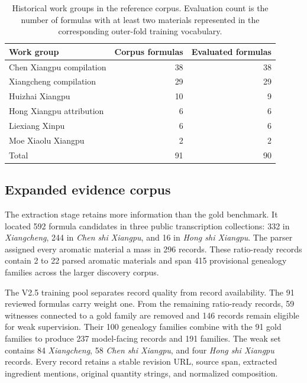 \documentclass[11pt,a4paper]{article}
\begin{document}
\begin{table}[t]
\centering
\caption{Historical work groups in the reference corpus. Evaluation count is the number of formulas with at least two materials represented in the corresponding outer-fold training vocabulary.}
\label{tab:corpus}
\begin{threeparttable}
\begin{tabular}{lrr}
\toprule
Work group & Corpus formulas & Evaluated formulas \\
\midrule
Chen Xiangpu compilation & 38 & 38 \\
Xiangcheng compilation & 29 & 29 \\
Huizhai Xiangpu & 10 & 9 \\
Hong Xiangpu attribution & 6 & 6 \\
Liexiang Xinpu & 6 & 6 \\
Moe Xiaolu Xiangpu & 2 & 2 \\
\midrule
Total & 91 & 90 \\
\bottomrule
\end{tabular}
\end{threeparttable}
\end{table}

\subsection{Expanded evidence corpus}

The extraction stage retains more information than the gold benchmark. It located 592 formula candidates in three public transcription collections: 332 in \emph{Xiangcheng}, 244 in \emph{Chen shi Xiangpu}, and 16 in \emph{Hong shi Xiangpu}. The parser assigned every aromatic material a mass in 296 records. These ratio-ready records contain 2 to 22 parsed aromatic materials and span 415 provisional genealogy families across the larger discovery corpus.

The V2.5 training pool separates record quality from record availability. The 91 reviewed formulas carry weight one. From the remaining ratio-ready records, 59 witnesses connected to a gold family are removed and 146 records remain eligible for weak supervision. Their 100 genealogy families combine with the 91 gold families to produce 237 model-facing records and 191 families. The weak set contains 84 \emph{Xiangcheng}, 58 \emph{Chen shi Xiangpu}, and four \emph{Hong shi Xiangpu} records. Every record retains a stable revision URL, source span, extracted ingredient mentions, original quantity strings, and normalized composition.
\end{document}
